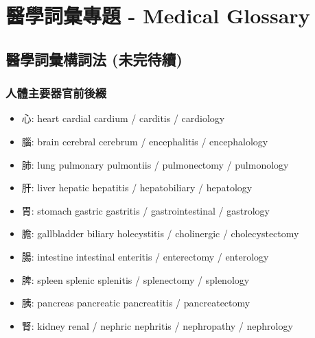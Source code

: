 \chapter{醫學詞彙專題 - Medical Glossary}
\section{醫學詞彙構詞法 (未完待續)}
\subsection{人體主要器官前後綴}
\begin{itemize}
  \itemsep0em
  \item 心: heart  cardial cardium / carditis / cardiology
  \item 腦: brain  cerebral cerebrum / encephalitis / encephalology
  \item 肺: lung  pulmonary pulmontiis / pulmonectomy / pulmonology
  \item 肝: liver  hepatic hepatitis / hepatobiliary / hepatology
  \item 胃: stomach  gastric gastritis / gastrointestinal / gastrology
  \item 膽: gallbladder  biliary holecystitis / cholinergic / cholecystectomy
  \item 腸: intestine  intestinal enteritis / enterectomy / enterology
  \item 脾: spleen  splenic splenitis / splenectomy / splenology
  \item 胰: pancreas  pancreatic pancreatitis / pancreatectomy
  \item 腎: kidney  renal / nephric nephritis / nephropathy / nephrology
\end{itemize}

